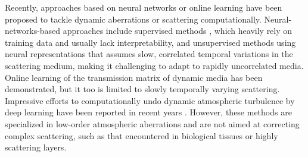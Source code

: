 \documentclass[pdflatex,sn-mathphys-num]{sn-jnl}%
\theoremstyle{thmstyleone}%
\theoremstyle{thmstyletwo}%
\theoremstyle{thmstylethree}%
\begin{document}
Recently, approaches based on neural networks or online learning have been proposed to tackle dynamic aberrations or scattering computationally. Neural-networks-based approaches include supervised methods \cite{sun2019image,liu2024learning}, which heavily rely on training data and usually lack interpretability, and unsupervised methods using neural representations \cite{feng23,xie2024wavemo} 
that assumes slow, correlated temporal variations in the scattering medium, making it challenging to adapt to rapidly uncorrelated media. 
Online learning of the transmission matrix of dynamic media \cite{valzania2023online} has been demonstrated, but it too is limited to slowly temporally varying scattering. 
Impressive efforts to computationally undo dynamic atmospheric turbulence by deep learning have been reported in recent years \cite{mao2022single,jiang2023nert,cai2023convrt,zhang2024imaging, zhang2024spatio}. However, these methods are specialized in low-order atmospheric aberrations and are not aimed at correcting complex scattering, such as that encountered in biological tissues or highly scattering layers.

\end{document}
